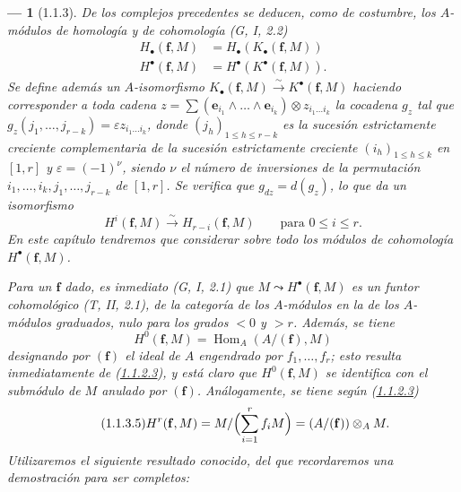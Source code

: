 \documentclass[10pt,oneside,openany]{book}
\theoremstyle{egaenv}\newtheorem*{env}{---}
\theoremstyle{egastatement}
\theoremstyle{egadescription}
\renewcommand{\leq}{\leqslant}
\begin{document}
\begin{env}[1.1.3]
\label{III.1.1.3-fr}
De los complejos precedentes se deducen, como de costumbre, los \emph{$A$-módulos
de homología y de cohomología} (G, I, 2.2)
\begin{align}
\label{III.1.1.3.1-fr}
\tag{1.1.3.1}
H_\bullet(\mathbf f,M)&=H_\bullet(K_\bullet(\mathbf f,M))\\
\label{III.1.1.3.2-fr}
\tag{1.1.3.2}
H^\bullet(\mathbf f,M)&=H^\bullet(K^\bullet(\mathbf f,M)).
\end{align}
Se define además un $A$-\emph{isomorfismo}
$K_\bullet(\mathbf f,M)\xrightarrow{\sim}K^\bullet(\mathbf f,M)$ haciendo
corresponder a toda cadena
$z=\sum(\mathbf e_{i_1}\wedge\ldots\wedge\mathbf e_{i_k})\otimes
z_{i_1\ldots i_k}$ la cocadena $g_z$ tal que
$g_z(j_1,\ldots,j_{r-k})=\varepsilon z_{i_1\ldots i_k}$, donde
$(j_h)_{1\leq h\leq r-k}$ es la sucesión estrictamente creciente complementaria
de la sucesión estrictamente creciente $(i_h)_{1\leq h\leq k}$ en $[1,r]$ y
$\varepsilon=(-1)^\nu$, siendo $\nu$ el número de inversiones de la permutación
$i_1,\ldots,i_k,j_1,\ldots,j_{r-k}$ de $[1,r]$. Se verifica que
$g_{dz}=d(g_z)$, lo que da un isomorfismo
\begin{equation}
\label{III.1.1.3.3-fr}
\tag{1.1.3.3}
H^i(\mathbf f,M)\xrightarrow{\sim}H_{r-i}(\mathbf f,M)
\qquad\text{para }0\leq i\leq r.
\end{equation}
En este capítulo tendremos que considerar sobre todo los módulos de cohomología
$H^\bullet(\mathbf f,M)$.

Para un $\mathbf f$ dado, es inmediato (G, I, 2.1) que
$M\leadsto H^\bullet(\mathbf f,M)$ es un \emph{funtor cohomológico}
(T, II, 2.1), de la categoría de los $A$-módulos en la de los $A$-módulos
graduados, nulo para los grados $<0$ y $>r$. Además, se tiene
\begin{equation}
\label{III.1.1.3.4-fr}
\tag{1.1.3.4}
H^0(\mathbf f,M)=\operatorname{Hom}_A(A/(\mathbf f),M)
\end{equation}
designando por $(\mathbf f)$ el ideal de $A$ engendrado por
$f_1,\ldots,f_r$; esto resulta inmediatamente de
(\hyperref[III.1.1.2.3-fr]{1.1.2.3}), y está claro que
$H^0(\mathbf f,M)$ se identifica con el submódulo de $M$ \emph{anulado por
$(\mathbf f)$}. Análogamente, se tiene según
(\hyperref[III.1.1.2.3-fr]{1.1.2.3})
\begin{equation}
\label{III.1.1.3.5-fr}
\tag{1.1.3.5}
H^r(\mathbf f,M)=M/\Bigl(\sum_{i=1}^r f_iM\Bigr)
=(A/(\mathbf f))\otimes_A M.
\end{equation}
Utilizaremos el siguiente resultado conocido, del que recordaremos una
demostración para ser completos:
\end{env}
\end{document}
